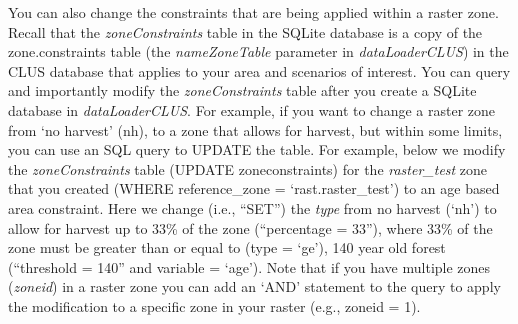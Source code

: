 \documentclass[
]{article}
\begin{document}
You can also change the constraints that are being applied within a
raster zone. Recall that the \emph{zoneConstraints} table in the SQLite
database is a copy of the zone.constraints table (the
\emph{nameZoneTable} parameter in \emph{dataLoaderCLUS}) in the CLUS
database that applies to your area and scenarios of interest. You can
query and importantly modify the \emph{zoneConstraints} table after you
create a SQLite database in \emph{dataLoaderCLUS}. For example, if you
want to change a raster zone from `no harvest' (nh), to a zone that
allows for harvest, but within some limits, you can use an SQL query to
UPDATE the table. For example, below we modify the
\emph{zoneConstraints} table (UPDATE zoneconstraints) for the
\emph{raster\_test} zone that you created (WHERE reference\_zone =
`rast.raster\_test') to an age based area constraint. Here we change
(i.e., ``SET'') the \emph{type} from no harvest (`nh') to allow for
harvest up to 33\% of the zone (``percentage = 33''), where 33\% of the
zone must be greater than or equal to (type = `ge'), 140 year old forest
(``threshold = 140'' and variable = `age'). Note that if you have
multiple zones (\emph{zoneid}) in a raster zone you can add an `AND'
statement to the query to apply the modification to a specific zone in
your raster (e.g., zoneid = 1).
\end{document}
